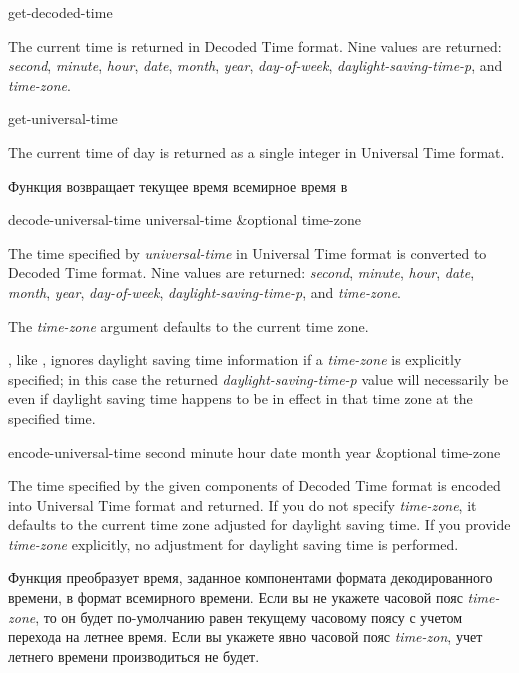 \begin{defun}[Function]
get-decoded-time 

The current time is returned in Decoded Time format.  Nine values
are returned: \emph{second}, \emph{minute}, \emph{hour}, \emph{date}, \emph{month},
\emph{year}, \emph{day-of-week}, \emph{daylight-saving-time-p}, and \emph{time-zone}.
\end{defun}

\begin{defun}[Function]
get-universal-time 

The current time of day is returned as a single integer
in Universal Time format.

Функция возвращает текущее время всемирное время в 
\end{defun}

\begin{defun}[Function]
decode-universal-time universal-time &optional time-zone

The time specified by \emph{universal-time} in Universal Time format
is converted to Decoded Time format.  Nine values
are returned: \emph{second}, \emph{minute}, \emph{hour}, \emph{date}, \emph{month},
\emph{year}, \emph{day-of-week}, \emph{daylight-saving-time-p}, and \emph{time-zone}.

The \emph{time-zone} argument defaults to the current time zone.

,
like , ignores daylight saving time information
if a \emph{time-zone} is explicitly specified; in this case
the returned \emph{daylight-saving-time-p} value will necessarily be
 even if daylight saving time happens to be in effect in that
time zone at the specified time.
\end{defun}

\begin{defun}[Function]
encode-universal-time second minute hour date month year &optional time-zone

The time specified by the given components of Decoded Time format is
encoded into Universal Time format and returned.  If you do not specify
\emph{time-zone}, it defaults to the current time zone adjusted for daylight
saving time.  If you provide \emph{time-zone} explicitly, no adjustment for
daylight saving time is performed.

Функция преобразует время, заданное компонентами формата декодированного
времени, в формат всемирного времени. Если вы не укажете часовой пояс
\emph{time-zone}, то он будет по-умолчанию равен текущему часовому поясу с
учетом перехода на летнее время. Если вы укажете явно часовой пояс
\emph{time-zon}, учет летнего времени производиться не будет.
\end{defun}

